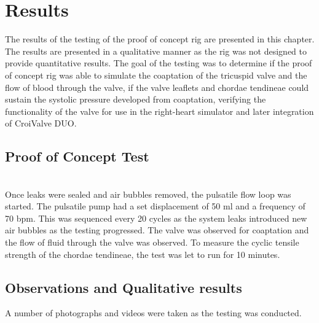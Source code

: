 \chapter{Results}\label{ch:results}
The results of the testing of the proof of concept rig are presented in this chapter. The results are presented in a qualitative manner as the rig was not designed to provide quantitative results.
The goal of the testing was to determine if the proof of concept rig was able to simulate the coaptation of the tricuspid valve and the flow of blood through the valve, if the valve leaflets and chordae tendineae could sustain the systolic pressure developed from coaptation, verifying the functionality of the valve for use in the right-heart simulator and later integration of CroiValve DUO.


\section{Proof of Concept Test}
\\
Once leaks were sealed and air bubbles removed, the pulsatile flow loop was started. The pulsatile pump had a set displacement of 50 ml and a frequency of 70 bpm.
This was sequenced every 20 cycles as the system leaks introduced new air bubbles as the testing progressed.
The valve was observed for coaptation and the flow of fluid through the valve was observed.
To measure the cyclic tensile strength of the chordae tendineae, the test was let to run for 10 minutes.



\section{Observations and Qualitative results}
A number of photographs and videos were taken as the testing was conducted.

